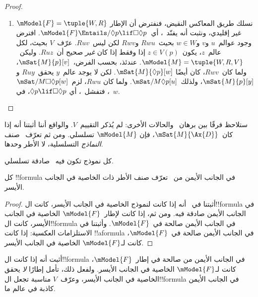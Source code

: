 \documentclass[../../../include/open-logic-section]{subfiles}
\begin{document}
\begin{proof}
\begin{enumerate}
    $\mSat{M}{p}[w]$؛ وبتعريف~$V$ لا يمكن هذا إلا إذا كان~$Ruw$، كما
    أُريد.
  \item نسلك طريق المعاكس النقيض، فنفترض أن الإطار
    $\mModel{F} = \tuple{W, R}$ غير إقليدي، ونثبت أنه يفنّد~،
    أي~$\mModel{F} \Entails/ \Diamond p \lif \Box\Diamond p$. افترض
    وجود عوالم~$u$ و$v$ و$w \in W$ بحيث~$Rwu$ و$Rwv$ لكن ليس~$Ruv$.
    عرّف~$V$ بحيث، لكل عالم~$z$، يكون~$z \in V(p)$ إذا وفقط إذا كان
    \emph{غير} صحيح أن~$Ruz$. وليكن~$\mModel{M} =\tuple{W, R, V}$.
    عندئذ، بحسب الفرض،~$\mSat{M}{p}[v]$، ولما كان~$Rwv$، كان أيضًا
    $\mSat{M}{\Diamond p}[w]$. لكن لا يوجد عالم~$y$ يحقق~$Ruy$ و
    $\mSat{M}{p}[y]$، ولذلك~$\mSat/{M}{\Diamond p}[u]$. ولما كان
    $Rwu$، لزم~$\mSat/{M}{\Box\Diamond p}[w]$، فتفشل~، أي
    $\Diamond p \lif \Box\Diamond p$، في~$w$.
  \end{enumerate}
\end{proof}

ستلاحظ فرقًا بين برهان~ والحالات الأخرى: لم يُذكر التقييم~$V$.
والواقع أننا أثبتنا أنه إذا كان~$\mSat{M}{\Ax{D}}$، فإن
$\mModel{M}$ تسلسلي. ومن ثم تعرّف~ صنف \emph{النماذج}
التسلسلية، لا الأطر وحدها.

\begin{cor}
  كل نموذج تكون فيه~ صادقة تسلسلي.
\end{cor}

\begin{cor}
كل !!{formula} في الجانب الأيمن من~ تعرّف صنف
الأطر ذات الخاصية في الجانب الأيسر.
\end{cor}

\begin{proof}
  أثبتنا في~ أنه إذا كانت لنموذج الخاصية
  في الجانب الأيسر، كانت ال!!{formula} في الجانب الأيمن صادقة فيه.
  ومن ثم، إذا كانت لإطار~$\mModel{F}$ الخاصية في الجانب الأيسر، كانت
  ال!!{formula} في الجانب الأيمن صالحة في~$\mModel{F}$. وأثبتنا في
   الاستلزامات العكسية: إذا كانت
  !!a{formula} في الجانب الأيمن صالحة في~$\mModel{F}$، كانت
  لـ$\mModel{F}$ الخاصية في الجانب الأيسر.
\end{proof}

\begin{prob}
أثبت أنه إذا كانت ال!!{formula} في الجانب الأيمن من
 صالحة في إطار~$\mModel{F}$،
كانت لـ$\mModel{F}$ الخاصية في الجانب الأيسر. ولفعل ذلك، تأمل إطارًا
\emph{لا} يحقق الخاصية في الجانب الأيسر، وعرّف~$V$ مناسبة تجعل
ال!!{formula} في الجانب الأيمن كاذبة في عالم ما.
\end{prob}
\end{document}
